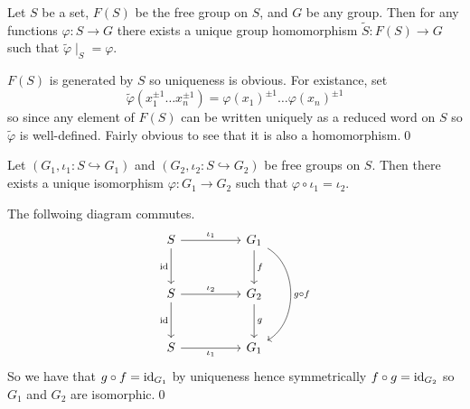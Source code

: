 \documentclass{article}
\begin{document}
\begin{lemma}
  Let $ S $ be a set, $ F(S) $ be the free group on $ S $, and $ G $ be any group. Then for any functions $ \varphi: S \to G $ there exists a unique group homomorphism $ \tilde S: F(S) \to G $ such that $ \tilde \varphi\mid_S = \varphi $.
\end{lemma}
\pf $ F(S) $ is generated by $ S $ so uniqueness is obvious. For existance, set
\[
	\tilde \varphi(x_1^{\pm 1}\dots x_n^{\pm 1}) = \varphi(x_1)^{\pm 1} \dots \varphi(x_n)^{\pm 1}
\]
so since any element of $ F(S) $ can be written uniquely as a reduced word on $ S $ so $ \tilde \varphi $ is well-defined. Fairly obvious to see that it is also a homomorphism.\qed
\begin{lemma}
  Let $ (G_1, \iota_1: S \hookrightarrow G_1) $ and $ (G_2, \iota_2: S \hookrightarrow G_2) $ be free groups on $ S $. Then there exists a unique isomorphism $ \varphi: G_1 \to G_2 $ such that $ \varphi\circ \iota_1 = \iota_2 $.
\end{lemma}
\pf The follwoing diagram commutes.
\[
\begin{tikzcd}[row sep=large, column sep=huge]
  S \arrow[r, "\iota_1"] \arrow[d, "\mathrm{id}"'] & G_1 \arrow[d, "f"] \arrow[dd, bend left=60, "g \circ f"] \\
  S \arrow[r, "\iota_2"] \arrow[d, "\mathrm{id}"'] & G_2 \arrow[d, "g"] \\
  S \arrow[r, "\iota_1"'] & G_1
\end{tikzcd}
\]
So we have that $ g\circ f = \mathrm{id}_{G_1} $ by uniqueness hence symmetrically $ f\circ g = \mathrm{id}_{G_2} $ so $ G_1 $ and $ G_2 $ are isomorphic.\qed
\end{document}
